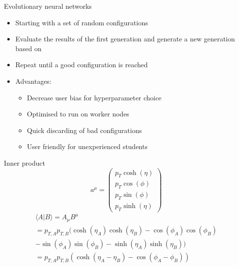 \begin{frame}{Evolutionary neural networks}
    \begin{itemize}
        \item Starting with a set of random configurations
        \vspace{0.2cm}
        \item Evaluate the results of the first generation and generate a new generation based on 
        \vspace{0.2cm}
        \item Repeat until a good configuration is reached
        \vspace{0.2cm}
        \item Advantages:
            \begin{itemize}
                \item Decrease user bias for hyperparameter choice
                \item Optimised to run on worker nodes
                \item Quick discarding of bad configurations
                \item User friendly for unexperienced students
            \end{itemize}
    \end{itemize}
\end{frame}

\begin{frame}{Inner product}
    \begin{equation*}
        a^{\mu} = \begin{pmatrix}
            p_T \cosh ( \eta ) \\
            p_T \cos ( \phi ) \\
            p_T \sin ( \phi ) \\
            p_T \sinh ( \eta ) \end{pmatrix}
    \end{equation*}
    \begin{align*}
        \langle A | B \rangle = A_{\mu} B^{\mu}\\
        = p_{T,A} p_{T,B} ( \cosh ( \eta_A ) \cosh ( \eta_B ) - \cos ( \phi_A ) \cos ( \phi_B)\\
        - \sin ( \phi_A ) \sin ( \phi_B ) -\sinh ( \eta_A ) \sinh ( \eta_B ) )\\
        = p_{T,A} p_{T,B} \left( \cosh ( \eta_A - \eta_B ) - \cos ( \phi_A - \phi_B ) \right)
    \end{align*}
\end{frame}

